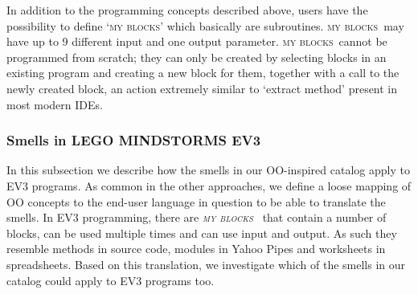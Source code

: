 \documentclass{sig-alternate}
\newcommand{\ms}{LEGO MINDSTORMS EV3}
\newcommand{\mbs}{\textsc{my blocks}}
\begin{document}
In addition to the programming concepts described above, users have the possibility to define `\mbs' which basically are subroutines. \mbs~may have up to 9 different input and one output parameter. \mbs~cannot be programmed from scratch; they can only be created by selecting blocks in an existing program and creating a new block for them, together with a call to the newly created block, an action extremely similar to `extract method' present in most modern IDEs. 

\subsubsection{Smells  in \ms}
In this subsection we describe how the smells in our OO-inspired catalog apply to EV3 programs. As common in the other approaches, we define a loose mapping of OO concepts to the end-user language in question to be able to translate the smells. In EV3 programming, there are  \emph{\mbs~} that contain a number of blocks, can be used multiple times and can use input and output. As such they resemble methods in source code, modules in Yahoo Pipes and worksheets in spreadsheets. Based on this translation, we investigate which of the smells in our catalog could apply to EV3 programs too. 
\end{document}
